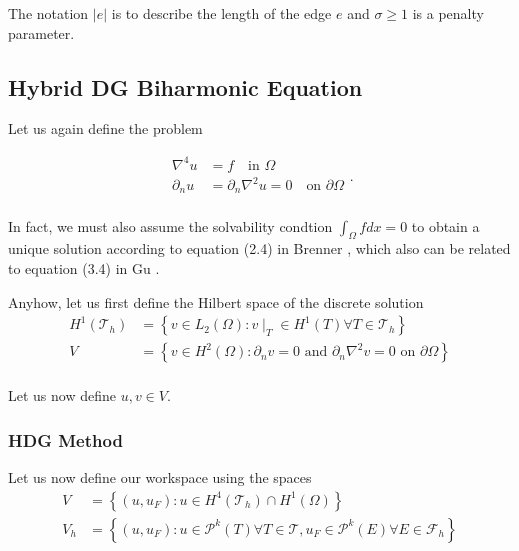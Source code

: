The notation $\left\lvert e \right\rvert $ is to describe the length of the edge $e$ and $\sigma  \ge  1$ is a penalty
parameter.




\newpage
\subsection{Hybrid DG Biharmonic Equation}%
\label{sub:hybrid_dg_biharmonic_equation}

Let us again define the problem

\begin{equation}
\label{eq:HDG_bi_problem}
\begin{split}
    \nabla ^4 u & = f \quad \text{in } \Omega   \\
    \partial _{n} u & = \partial _{n} \nabla ^2 u = 0 \quad \text{on } \partial \Omega   \\
\end{split}
.\end{equation}

In fact, we must also assume the solvability condtion $ \int_{\Omega }^{} f dx = 0$ to obtain a unique solution according to
equation (2.4) in Brenner \cite{brenner2012}, which also can be related to equation (3.4) in Gu \cite{gu2012c0}.

Anyhow,
let us first define the Hilbert space of the discrete solution \[
\begin{split}
    H^{1}\left( \mathcal{T}_{h}  \right)  & = \left\{ v \in L_{2} \left( \Omega  \right) : v  \mid _{T} \in H^{1} \left( T
    \right) \forall T \in \mathcal{T}_{h}    \right\} \\
    V &=  \left\{ v \in H^2\left( \Omega  \right) : \partial _{n} v = 0 \text{ and } \partial _{n} \nabla ^2 v = 0 \text{ on } \partial \Omega  \right\} \\
\end{split}
\]

Let us now define $u,v \in V$.

\subsubsection{HDG Method}%
\label{ssub:dg_method}
Let us now define our workspace using the spaces
 \[
\begin{split}
    V &=  \left\{ \left( u, u_{F}  \right): u \in H^{4}\left( \mathcal{T} _{h} \right) \cap H^{1}\left( \Omega  \right)   \right\} \\
    V_{h} &=  \left\{ \left( u, u_{F}  \right) : u \in \mathcal{P} ^{k}\left( T \right) \forall T \in  \mathcal{T} ,
    u_{F} \in \mathcal{P} ^{k}\left( E \right) \forall E \in  \mathcal{F}_{h}    \right\} \\
\end{split}
\]

